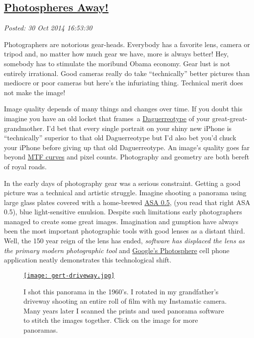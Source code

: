 %

\subsection*{\href{https://bakerjd99.wordpress.com/2014/10/30/photospheres-away-2/}{Photospheres Away!}}


\noindent\emph{Posted: 30 Oct 2014 16:53:30}
\vspace{6pt}

Photographers are notorious gear-heads. Everybody has a favorite lens,
camera or tripod and, no matter how much gear we have, more is always
better! Hey, somebody has to stimulate the moribund Obama economy. Gear
lust is not entirely irrational. Good cameras really do take
``technically'' better pictures than mediocre or poor cameras but here's
the infuriating thing. Technical merit does not make the image!

Image quality depends of many things and changes over time. If you doubt
this imagine you have an old locket that frames~a
\href{https://en.wikipedia.org/wiki/Daguerreotype}{Daguerreotype} of
your great-great-grandmother. I'd bet that every single portrait on your
shiny new iPhone is ``technically'' superior to that old Daguerreotype
but I'd also bet you'd chuck your iPhone before giving up that old
Daguerreotype. An image's quality goes far beyond
\href{http://photographylife.com/how-to-read-mtf-charts}{MTF curves} and
pixel counts. Photography and geometry are both bereft of royal roads.

In the early days of photography gear was a serious constraint. Getting
a good picture was a technical and artistic struggle. Imagine shooting a
panorama using large glass plates covered with a home-brewed
\href{http://www.alternativephotography.com/wp/processes/gelatin-silver/silver-gelatin-dry-plate-process}{ASA
0.5}, (you read that right ASA 0.5), blue light-sensitive emulsion.
Despite such limitations early photographers managed to create some
great images. Imagination and gumption have always been the most
important photographic tools with good lenses as a distant third. Well,
the 150 year reign of the lens has ended, \emph{software has displaced
the lens as the primary modern photographic tool} and
\href{https://itunes.apple.com/us/app/photo-sphere-camera/id904418768}{Google's
Photosphere} cell phone application neatly demonstrates this
technological shift.

\captionsetup[figure]{labelformat=empty}
\begin{figure}[htbp]
\centering
\href{http://conceptcontrol.smugmug.com/Themes/Manipulations/Panoramas-1}{\texttt{[image: gert-driveway.jpg]}}
\caption{I shot this panorama in the 1960's. I rotated in my grandfather's
driveway shooting an entire roll of film with my Instamatic camera. Many
years later I scanned the prints and used panorama software to stitch
the images together. Click on the image for more
panoramas.}
\label{fig:4832X0}
\end{figure}


